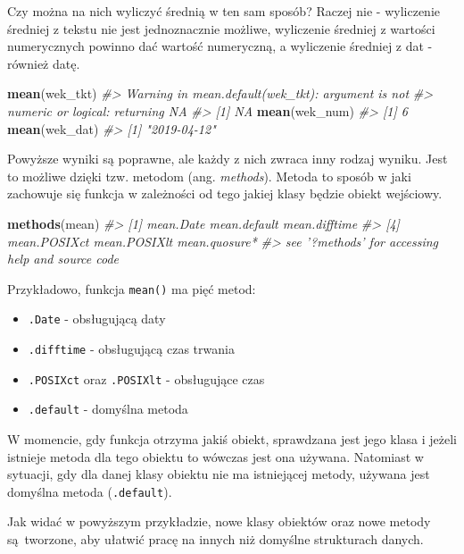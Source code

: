 \documentclass[paper=6in:9in,pagesize=pdftex,headinclude=on,footinclude=on,10pt]{scrbook}
\newenvironment{Shaded}{\begin{snugshade}}{\end{snugshade}}
\newcommand{\CommentTok}[1]{\textcolor[rgb]{0.56,0.35,0.01}{\textit{#1}}}
\newcommand{\KeywordTok}[1]{\textcolor[rgb]{0.13,0.29,0.53}{\textbf{#1}}}
\newcommand{\NormalTok}[1]{#1}
\providecommand{\tightlist}{%
  \setlength{\itemsep}{0pt}\setlength{\parskip}{0pt}}
\begin{document}
Czy można na nich wyliczyć średnią w ten sam sposób?
Raczej nie - wyliczenie średniej z tekstu nie jest jednoznacznie możliwe, wyliczenie średniej z wartości numerycznych powinno dać wartość numeryczną, a wyliczenie średniej z dat - również datę.

\begin{Shaded}
\begin{Highlighting}[]
\KeywordTok{mean}\NormalTok{(wek_tkt)}
\CommentTok{#> Warning in mean.default(wek_tkt): argument is not}
\CommentTok{#> numeric or logical: returning NA}
\CommentTok{#> [1] NA}
\KeywordTok{mean}\NormalTok{(wek_num)}
\CommentTok{#> [1] 6}
\KeywordTok{mean}\NormalTok{(wek_dat)}
\CommentTok{#> [1] "2019-04-12"}
\end{Highlighting}
\end{Shaded}

Powyższe wyniki są poprawne, ale każdy z nich zwraca inny rodzaj wyniku.
Jest to możliwe dzięki tzw. metodom (ang. \emph{methods}).
Metoda to sposób w jaki zachowuje się funkcja w zależności od tego jakiej klasy będzie obiekt wejściowy.

\begin{Shaded}
\begin{Highlighting}[]
\KeywordTok{methods}\NormalTok{(mean)}
\CommentTok{#> [1] mean.Date     mean.default  mean.difftime}
\CommentTok{#> [4] mean.POSIXct  mean.POSIXlt  mean.quosure*}
\CommentTok{#> see '?methods' for accessing help and source code}
\end{Highlighting}
\end{Shaded}

Przykładowo, funkcja \texttt{mean()} ma pięć metod:

\begin{itemize}
\tightlist
\item
  \texttt{.Date} - obsługującą daty
\item
  \texttt{.difftime} - obsługującą czas trwania
\item
  \texttt{.POSIXct} oraz \texttt{.POSIXlt} - obsługujące czas
\item
  \texttt{.default} - domyślna metoda
\end{itemize}

W momencie, gdy funkcja otrzyma jakiś obiekt, sprawdzana jest jego klasa i jeżeli istnieje metoda dla tego obiektu to wówczas jest ona używana.
Natomiast w sytuacji, gdy dla danej klasy obiektu nie ma istniejącej metody, używana jest domyślna metoda (\texttt{.default}).

Jak widać w powyższym przykładzie, nowe klasy obiektów oraz nowe metody są~tworzone, aby ułatwić pracę na innych niż domyślne strukturach danych.
\end{document}
